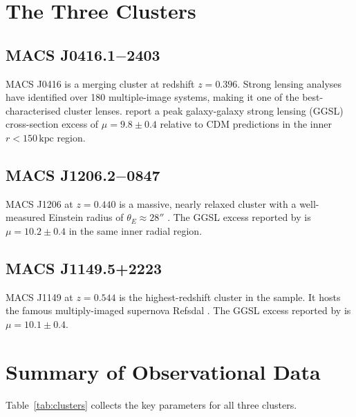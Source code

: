\documentclass[11pt,a4paper,openright]{book}
\theoremstyle{dm3thm}
\theoremstyle{dm3def}
\begin{document}
\section{The Three Clusters}

\subsection{MACS J0416.1$-$2403}

MACS J0416 is a merging cluster at redshift $z = 0.396$.  Strong lensing
analyses \citep{Jauzac2014,Richard2021} have identified over 180 multiple-image
systems, making it one of the best-characterised cluster lenses.
\citet{NatarajanChiangDutra2026} report a peak galaxy-galaxy strong lensing
(GGSL) cross-section excess of $\mu = 9.8 \pm 0.4$ relative to CDM predictions
in the inner $r < 150\,\mathrm{kpc}$ region.

\subsection{MACS J1206.2$-$0847}

MACS J1206 at $z = 0.440$ is a massive, nearly relaxed cluster with a
well-measured Einstein radius of $\theta_E \approx 28''$ \citep{Biviano2013}.
The GGSL excess reported by \citet{NatarajanChiangDutra2026} is $\mu = 10.2
\pm 0.4$ in the same inner radial region.

\subsection{MACS J1149.5+2223}

MACS J1149 at $z = 0.544$ is the highest-redshift cluster in the sample.
It hosts the famous multiply-imaged supernova Refsdal \citep{Kelly2015}.
The GGSL excess reported by \citet{NatarajanChiangDutra2026} is $\mu = 10.1
\pm 0.4$.

\section{Summary of Observational Data}

Table~\ref{tab:clusters} collects the key parameters for all three clusters.
\end{document}
